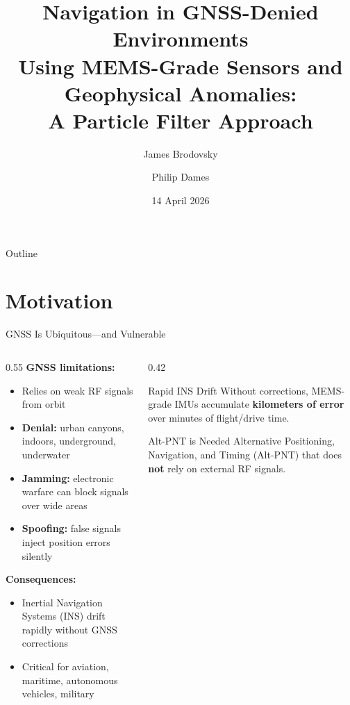 \documentclass[aspectratio=169]{beamer}
\title[GNSS-Denied Geophysical Navigation]{Navigation in GNSS-Denied Environments\\
Using MEMS-Grade Sensors and Geophysical Anomalies:\\
A Particle Filter Approach}
\author[Brodovsky \& Dames]{James Brodovsky \and Philip Dames}
\institute[Temple University]{Department of Mechanical Engineering\\Temple University}
\date{14 April 2026}
\begin{document}
\begin{frame}
    \titlepage
\end{frame}

\begin{frame}{Outline}
    \tableofcontents
\end{frame}

\section{Motivation}

\begin{frame}{GNSS Is Ubiquitous---and Vulnerable}
    \begin{columns}
        \begin{column}{0.55\textwidth}
            \textbf{GNSS limitations:}
            \begin{itemize}
                \item Relies on weak RF signals from orbit
                \item \textbf{Denial:} urban canyons, indoors, underground, underwater
                \item \textbf{Jamming:} electronic warfare can block signals over wide areas
                \item \textbf{Spoofing:} false signals inject position errors silently
            \end{itemize}
            \vspace{0.4em}
            \textbf{Consequences:}
            \begin{itemize}
                \item Inertial Navigation Systems (INS) drift rapidly without GNSS corrections
                \item Critical for aviation, maritime, autonomous vehicles, military
            \end{itemize}
        \end{column}
        \begin{column}{0.42\textwidth}
            \begin{block}{Rapid INS Drift}
                \small
                Without corrections, MEMS-grade IMUs accumulate \textbf{kilometers of error} over minutes of flight/drive time.
            \end{block}
            \vspace{0.5em}
            \begin{alertblock}{Alt-PNT is Needed}
                \small
                Alternative Positioning, Navigation, and Timing (Alt-PNT) that does \textbf{not} rely on external RF signals.
            \end{alertblock}
        \end{column}
    \end{columns}
\end{frame}
\end{document}
